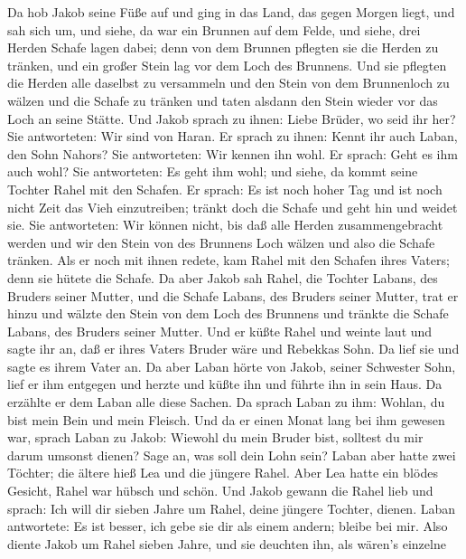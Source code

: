  Da hob Jakob seine Füße auf und ging in das Land, das gegen
Morgen liegt,  und sah sich um, und siehe, da war ein
Brunnen auf dem Felde, und siehe, drei Herden Schafe lagen dabei; denn
von dem Brunnen pflegten sie die Herden zu tränken, und ein großer Stein
lag vor dem Loch des Brunnens.  Und sie pflegten die Herden
alle daselbst zu versammeln und den Stein von dem Brunnenloch zu wälzen
und die Schafe zu tränken und taten alsdann den Stein wieder vor das
Loch an seine Stätte.  Und Jakob sprach zu ihnen: Liebe
Brüder, wo seid ihr her? Sie antworteten: Wir sind von Haran.
 Er sprach zu ihnen: Kennt ihr auch Laban, den Sohn Nahors?
Sie antworteten: Wir kennen ihn wohl.  Er sprach: Geht es
ihm auch wohl? Sie antworteten: Es geht ihm wohl; und siehe, da kommt
seine Tochter Rahel mit den Schafen.  Er sprach: Es ist noch
hoher Tag und ist noch nicht Zeit das Vieh einzutreiben; tränkt doch die
Schafe und geht hin und weidet sie.  Sie antworteten: Wir
können nicht, bis daß alle Herden zusammengebracht werden und wir den
Stein von des Brunnens Loch wälzen und also die Schafe tränken.
 Als er noch mit ihnen redete, kam Rahel mit den Schafen
ihres Vaters; denn sie hütete die Schafe.  Da aber Jakob
sah Rahel, die Tochter Labans, des Bruders seiner Mutter, und die Schafe
Labans, des Bruders seiner Mutter, trat er hinzu und wälzte den Stein
von dem Loch des Brunnens und tränkte die Schafe Labans, des Bruders
seiner Mutter.  Und er küßte Rahel und weinte laut
 und sagte ihr an, daß er ihres Vaters Bruder wäre und
Rebekkas Sohn. Da lief sie und sagte es ihrem Vater an.  Da
aber Laban hörte von Jakob, seiner Schwester Sohn, lief er ihm entgegen
und herzte und küßte ihn und führte ihn in sein Haus. Da erzählte er dem
Laban alle diese Sachen.  Da sprach Laban zu ihm: Wohlan,
du bist mein Bein und mein Fleisch. Und da er einen Monat lang bei ihm
gewesen war,  sprach Laban zu Jakob: Wiewohl du mein Bruder
bist, solltest du mir darum umsonst dienen? Sage an, was soll dein Lohn
sein?  Laban aber hatte zwei Töchter; die ältere hieß Lea
und die jüngere Rahel.  Aber Lea hatte ein blödes Gesicht,
Rahel war hübsch und schön.  Und Jakob gewann die Rahel
lieb und sprach: Ich will dir sieben Jahre um Rahel, deine jüngere
Tochter, dienen.  Laban antwortete: Es ist besser, ich gebe
sie dir als einem andern; bleibe bei mir.  Also diente
Jakob um Rahel sieben Jahre, und sie deuchten ihn, als wären's einzelne
